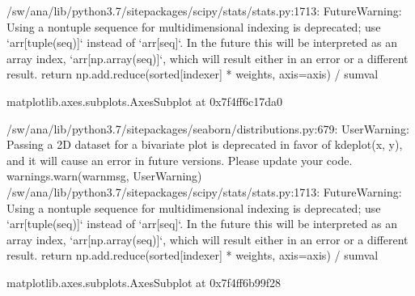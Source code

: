 \documentclass[letterpaper,10pt,english]{sphinxhowto}
\begin{document}

%
\begin{sphinxVerbatim}[commandchars=\\\{\}]

\PYG{p}{[}\PYG{p}{]}
\PYG{p}{[}\PYG{p}{]}
\end{sphinxVerbatim}

%
\begin{sphinxVerbatim}[commandchars=\\\{\}]
/sw/ana/lib/python3.7/site\PYGZhy{}packages/scipy/stats/stats.py:1713: FutureWarning: Using a non\PYGZhy{}tuple sequence for multidimensional indexing is deprecated; use {}`arr[tuple(seq)]{}` instead of {}`arr[seq]{}`. In the future this will be interpreted as an array index, {}`arr[np.array(seq)]{}`, which will result either in an error or a different result.
  return np.add.reduce(sorted[indexer] * weights, axis=axis) / sumval





\PYGZlt{}matplotlib.axes.\PYGZus{}subplots.AxesSubplot at 0x7f4ff6c17da0\PYGZgt{}
\end{sphinxVerbatim}


%
\begin{sphinxVerbatim}[commandchars=\\\{\}]
\end{sphinxVerbatim}

%
\begin{sphinxVerbatim}[commandchars=\\\{\}]
/sw/ana/lib/python3.7/site\PYGZhy{}packages/seaborn/distributions.py:679: UserWarning: Passing a 2D dataset for a bivariate plot is deprecated in favor of kdeplot(x, y), and it will cause an error in future versions. Please update your code.
  warnings.warn(warn\PYGZus{}msg, UserWarning)
/sw/ana/lib/python3.7/site\PYGZhy{}packages/scipy/stats/stats.py:1713: FutureWarning: Using a non\PYGZhy{}tuple sequence for multidimensional indexing is deprecated; use {}`arr[tuple(seq)]{}` instead of {}`arr[seq]{}`. In the future this will be interpreted as an array index, {}`arr[np.array(seq)]{}`, which will result either in an error or a different result.
  return np.add.reduce(sorted[indexer] * weights, axis=axis) / sumval





\PYGZlt{}matplotlib.axes.\PYGZus{}subplots.AxesSubplot at 0x7f4ff6b99f28\PYGZgt{}
\end{sphinxVerbatim}
\end{document}
